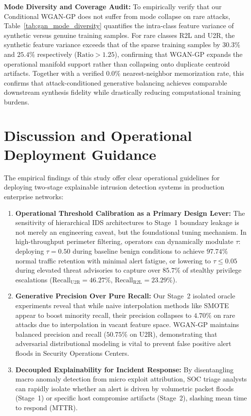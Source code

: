 \documentclass[journal]{IEEEtran}
\begin{document}
\textbf{Mode Diversity and Coverage Audit:} To empirically verify that our Conditional WGAN-GP does not suffer from mode collapse on rare attacks, Table~\ref{tab:gan_mode_diversity} quantifies the intra-class feature variance of synthetic versus genuine training samples. For rare classes R2L and U2R, the synthetic feature variance exceeds that of the sparse training samples by $30.3\%$ and $25.4\%$ respectively ($\text{Ratio} > 1.25$), confirming that WGAN-GP expands the operational manifold support rather than collapsing onto duplicate centroid artifacts. Together with a verified $0.0\%$ nearest-neighbor memorization rate, this confirms that attack-conditioned generative balancing achieves comparable downstream synthesis fidelity while drastically reducing computational training burdens.

\section{Discussion and Operational Deployment Guidance}
\label{sec:discussion}
The empirical findings of this study offer clear operational guidelines for deploying two-stage explainable intrusion detection systems in production enterprise networks:
\begin{enumerate}
    \item \textbf{Operational Threshold Calibration as a Primary Design Lever:} The sensitivity of hierarchical IDS architectures to Stage~1 boundary leakage is not merely an engineering caveat, but the foundational tuning mechanism. In high-throughput perimeter filtering, operators can dynamically modulate $\tau$: deploying $\tau = 0.50$ during baseline benign conditions to achieve $97.74\%$ normal traffic retention with minimal alert fatigue, or lowering to $\tau \le 0.05$ during elevated threat advisories to capture over $85.7\%$ of stealthy privilege escalations ($\text{Recall}_{\text{U2R}} = 46.27\%$, $\text{Recall}_{\text{R2L}} = 23.29\%$).
    \item \textbf{Generative Precision Over Pure Recall:} Our Stage~2 isolated oracle experiments reveal that while naive interpolation methods like SMOTE appear to boost minority recall, their precision collapses to $4.70\%$ on rare attacks due to interpolation in vacant feature space. WGAN-GP maintains balanced precision and recall ($50.75\%$ on U2R), demonstrating that adversarial distributional modeling is vital to prevent false positive alert floods in Security Operations Centers.
    \item \textbf{Decoupled Explainability for Incident Response:} By disentangling macro anomaly detection from micro exploit attribution, SOC triage analysts can rapidly isolate whether an alert is driven by volumetric packet floods (Stage~1) or specific host compromise artifacts (Stage~2), slashing mean time to respond (MTTR).
\end{enumerate}
\end{document}
